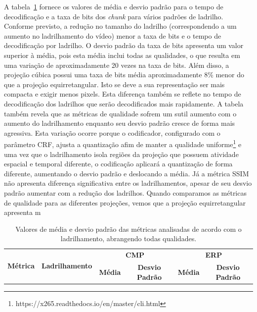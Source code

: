 {A tabela~\ref{tab:stats} fornece os valores de média e desvio padrão para o tempo de decodificação e a taxa de bits dos \textit{chunk} para vários padrões de ladrilho. Conforme previsto, a redução no tamanho do ladrilho (correspondendo a um aumento no ladrilhamento do vídeo) menor a taxa de bits e o tempo de decodificação por ladrilho. O desvio padrão da taxa de bits apresenta um valor superior à média, pois esta média inclui todas as qualidades, o que resulta em uma variação de aproximadamente 20 vezes na taxa de bits. Além disso, a projeção cúbica possui uma taxa de bits média aproximadamente 8\% menor do que a projeção equirretangular. Isto se deve a sua representação ser mais compacta e exigir menos pixels. Esta diferença também se reflete no tempo de decodificação dos ladrilhos que serão decodificados mais rapidamente. 
A tabela também revela que as métricas de qualidade sofrem um sutil aumento com o aumento do ladrilhamento enquanto seu desvio padrão cresce de forma mais agressiva. Esta variação ocorre porque o codificador, configurado com o parâmetro CRF, ajusta a quantização afim de manter a qualidade uniforme\footnote{https://x265.readthedocs.io/en/master/cli.html} e uma vez que o ladrilhamento isola regiões da projeção que possuem atividade espacial e temporal diferente, o codificação aplicará a quantização de forma diferente, aumentando o desvio padrão e deslocando a média. %
Já a métrica SSIM não apresenta diferença significativa entre os ladrilhamentos, apesar de seu desvio padrão aumentar com a redução dos ladrilhos. Quando comparamos as métricas de qualidade para as diferentes projeções, vemos que a projeção equirretangular apresenta m

\begin{longtable}{|c|c|c|c|c|c|}
        \caption{Valores de média e desvio padrão das métricas analisadas de acordo com o ladrilhamento, abrangendo todas qualidades.} \label{tab:stats} \\
        
        \hline
        \multirow{2}{*}{\textbf{Métrica}} &  \multirow{2}{*}{\textbf{Ladrilhamento}} & \multicolumn{2}{c|}{\textbf{CMP}} & \multicolumn{2}{c|}{\textbf{ERP}} \\
        \cline{3-6}
        &   & \textbf{Média} & \textbf{Desvio Padrão} & \textbf{Média} & \textbf{Desvio Padrão} \\
        \hline
        \endfirsthead
        

\end{longtable}}
